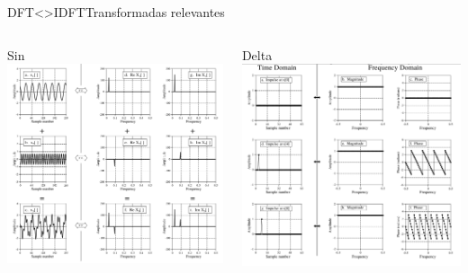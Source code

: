\begin{frame}{DFT<>IDFT}{Transformadas relevantes}
   \begin{columns}[c]
      \begin{column}{.33\textwidth}
         Sin
         \centering\includegraphics[width=1.0\textwidth]{4_clase/equivalencias_seno}
      \end{column}
      \begin{column}{.33\textwidth}
         Delta
         \centering\includegraphics[width=1.0\textwidth]{4_clase/equivalencias_delta}

\end{column}
\end{columns}
\end{frame}
